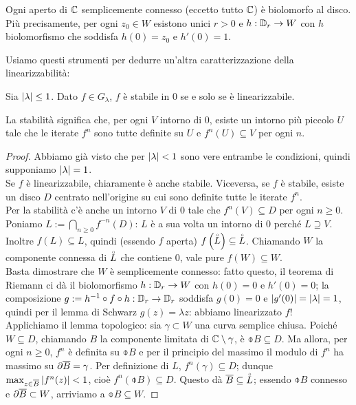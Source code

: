 \begin{teo}[Riemann]Ogni aperto di $\mathbb{C}$ semplicemente connesso (eccetto tutto $\mathbb{C}$) è biolomorfo al disco.
Più precisamente, per ogni $z_0\in W$ esistono unici $r>0$ e $h:\mathbb{D}_r\to W$ con $h$ biolomorfismo
che soddisfa $h(0)=z_0$ e $h'(0)=1$.
\end{teo}

Usiamo questi strumenti per dedurre un'altra caratterizzazione della linearizzabilità:

\begin{teo}Sia $\left|\lambda\right|\le 1$. Dato $f\in G_\lambda$, $f$ è stabile in $0$ se e solo se è linearizzabile.
\end{teo}

La stabilità significa che, per ogni $V$ intorno di $0$, esiste un intorno più piccolo $U$ tale che
le iterate $f^n$ sono tutte definite su $U$ e $f^n(U)\subseteq V$ per ogni $n$.

\begin{proof}Abbiamo già visto che per $\left|\lambda\right|<1$ sono vere entrambe le condizioni,
quindi supponiamo $\left|\lambda\right|=1$. \\
Se $f$ è linearizzabile, chiaramente è anche stabile. Viceversa, se $f$ è stabile, esiste un disco $D$
centrato nell'origine su cui sono definite tutte le iterate $f^n$. \\
Per la stabilità c'è anche un intorno $V$ di $0$ tale che $f^n(V)\subseteq D$ per ogni $n\ge 0$.
Poniamo $L:=\bigcap_{n\ge 0}f^{-n}(D)$: $L$ è a sua volta un intorno di $0$ perché $L\supseteq V$. \\
Inoltre $f(L)\subseteq L$, quindi (essendo $f$ aperta) $f\left(\accentset{\circ}{L}\right)\subseteq\accentset{\circ}{L}$.
Chiamando $W$ la componente connessa di $\accentset{\circ}{L}$ che contiene $0$, vale pure $f(W)\subseteq W$. \\
Basta dimostrare che $W$ è semplicemente connesso: fatto questo, il teorema di Riemann ci dà
il biolomorfismo $h:\mathbb{D}_r\to W$ con $h(0)=0$ e $h'(0)=0$; la composizione $g:=h^{-1}\circ f\circ h:\mathbb{D}_r\to\mathbb{D}_r$
soddisfa $g(0)=0$ e $\left|g'(0)\right|=\left|\lambda\right|=1$, quindi per il lemma di Schwarz $g(z)=\lambda z$:
abbiamo linearizzato $f$! \\
Applichiamo il lemma topologico: sia $\gamma\subset W$ una curva semplice chiusa. Poiché $W\subseteq D$,
chiamando $B$ la componente limitata di $\mathbb{C}\setminus\gamma$, è $\obar{B}\subseteq D$.
Ma allora, per ogni $n\ge 0$, $f^n$ è definita su $\obar{B}$ e per il principio del massimo
il modulo di $f^n$ ha massimo su $\partial\overline{B}=\gamma$. Per definizione di $L$, $f^n(\gamma)\subseteq D$;
dunque $\max_{z\in\overline{B}}\left|f^n(z)\right|<1$, cioè $f^n(\obar{B})\subseteq D$.
Questo dà $\overline{B}\subseteq\accentset{\circ}{L}$; essendo $\obar{B}$ connesso e $\partial\overline{B}\subset W$, arriviamo a $\obar{B}\subseteq W$.
\end{proof}

